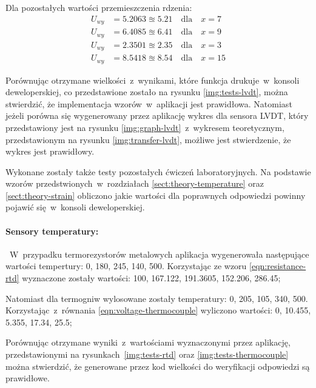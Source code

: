 Dla pozostałych wartości przemieszczenia rdzenia:
\begin{align*}
  U_{wy} & =5.2063\approxeq 5.21\quad\text{dla}\quad x=7  \\
  U_{wy} & =6.4085\approxeq 6.41\quad\text{dla}\quad x=9  \\
  U_{wy} & =2.3501\approxeq 2.35\quad\text{dla}\quad x=3  \\
  U_{wy} & =8.5418\approxeq 8.54\quad\text{dla}\quad x=15
\end{align*}

Porównując otrzymane wielkości~z~wynikami, które funkcja drukuje~w~konsoli deweloperskiej, co
przedstawione zostało na rysunku \ref{img:tests-lvdt}, można stwierdzić, że implementacja
wzorów~w~aplikacji jest prawidłowa. Natomiast jeżeli porówna się wygenerowany przez aplikację wykres
dla sensora LVDT, który przedstawiony jest na rysunku \ref{img:graph-lvdt}~z~wykresem teoretycznym,
przedstawionym na rysunku \ref{img:transfer-lvdt}, możliwe jest stwierdzenie, że wykres jest
prawidłowy.



Wykonane zostały także testy pozostałych ćwiczeń laboratoryjnych. Na podstawie wzorów
przedstwionych~w~rozdziałach \ref{sect:theory-temperature} oraz \ref{sect:theory-strain} obliczono
jakie wartości dla poprawnych odpowiedzi powinny pojawić się~w~konsoli deweloperskiej.

\paragraph{Sensory temperatury:}~W~przypadku termorezystorów metalowych aplikacja wygenerowała
następujące wartości tempertury: 0, 180, 245, 140, 500. Korzystając ze wzoru
\ref{eqn:resistance-rtd} wyznaczone zostały wartości: 100, 167.122, 191.3605, 152.206, 286.45;

Natomiast dla termogniw wylosowane zostały temperatury: 0, 205, 105, 340, 500.
Korzystając~z~równania \ref{eqn:voltage-thermocouple} wyliczono wartości: 0, 10.455, 5.355, 17.34,
25.5;

Porównując otrzymane wyniki~z~wartościami wyznaczonymi przez aplikację, przedstawionymi na
rysunkach~\ref{img:tests-rtd} oraz \ref{img:tests-thermocouple} można stwierdzić, że
generowane przez kod wielkości do weryfikacji odpowiedzi są prawidłowe.

